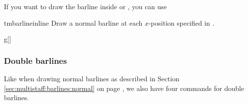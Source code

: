 \documentclass[11pt,a4paper]{ltxdoc}
\begin{document}
If you want to draw the barline inside  or , 
you can use 
\begin{docCommand}{tmbarlineinline}{}
  Draw a normal barline at each $x$-position specified in .
\end{docCommand}
\begin{dispExample}
\begin{tmsinglestaff}%
  \begin{tmstaff}{g}[]
  \end{tmstaff}%
\end{tmsinglestaff}
\end{dispExample}
\subsubsection{Double barlines}\label{sec:multistaff:barlines:double}
Like when drawing normal barlines as described in Section 
\ref{sec:multistaff:barlines:normal} on page \pageref{sec:multistaff:barlines:normal}, 
we also have four commands for double barlines.
\end{document}
